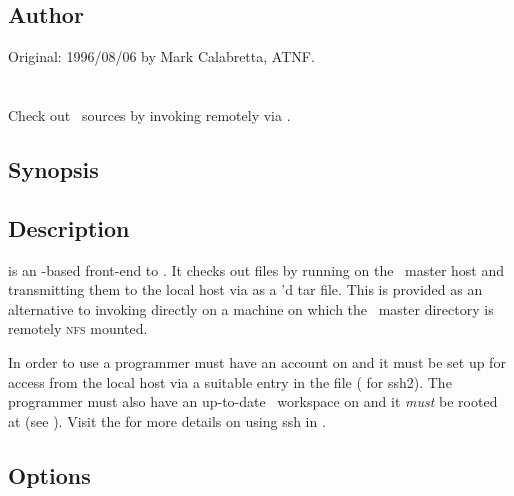\subsection*{Author}
 
Original: 1996/08/06 by Mark Calabretta, ATNF.

 
\newpage
\section{}
\label{rao}
 
Check out \aipspp\ sources by invoking  remotely via .

\subsection*{Synopsis}
 
\begin{synopsis}
\end{synopsis}
 
\subsection*{Description}
 
 is an -based front-end to .  It checks out
files by running  on the \aipspp\ master host and transmitting
them to the local host via  as a 'd tar file.  This
is provided as an alternative to invoking  directly on a machine
on which the \aipspp\ master directory is remotely \textsc{nfs} mounted.
 
In order to use  a programmer must have an account on
 and it must be set up for  access from the
local host via a suitable entry in the  file
( for ssh2). The programmer
must also have an up-to-date \aipspp\ workspace on  and
it \emph{must} be  rooted at  (see ). 
Visit the 
for more details on using ssh in \aipspp.
\subsection*{Options}
 
